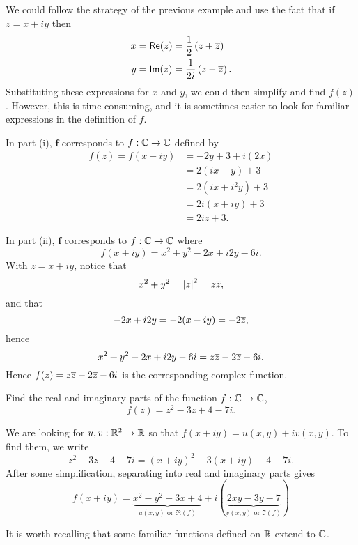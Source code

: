 \begin{solution}
We could follow the strategy of the previous example and use the fact that if $z=x+iy$ then
\begin{align*}
x & = \textsf{Re}(z) = \frac{1}{2} \left( z+ \overline{z} \right) \\
y & = \textsf{Im} (z) = \frac{1}{2i} \left( z- \overline{z} \right).
\end{align*}
Substituting these expressions for $x$ and $y$, we could then simplify and find $f(z)$. However, this is time consuming, and it is sometimes easier to look for familiar expressions in the definition of $f$.

In part (i), $\mathbf{f}$ corresponds to $f: \mathbb{C} \to \mathbb{C}$ defined by
\begin{align*}
f(z) = f(x+iy) &= -2y+3+i(2x) \\
& = 2(ix-y) + 3 \\
& = 2(ix+i^2y)+3 \\
& = 2i(x+iy)+3 \\
& = 2iz+3.
\end{align*}

In part (ii), $\mathbf{f}$ corresponds to $f:\mathbb{C} \to \mathbb{C}$ where
\[
f(x+iy) = x^2+y^2-2x+i2y-6i.
\]
With $z=x+iy$, notice that
\[
x^2+y^2=\left| z \right|^2 = z \overline{z},
\]
and that
\[
-2x+i2y = -2 (x-iy) = -2 \overline{z},
\]
hence
\[
x^2+y^2-2x+i2y-6i = z \overline{z} - 2 \overline{z} -6i.
\]
Hence $f(z) = z \overline{z}-2\overline{z}-6i$ is the corresponding complex function.



\end{solution}

\begin{example}
Find the real and imaginary parts of the function $f:\mathbb{C} \to \mathbb{C}$, 
\[
f(z) = z^2-3z+4-7i.
\]
\end{example}

\begin{solution}
We are looking for $u,v:\mathbb{R}^2 \to \mathbb{R}$ so that $f(x+iy)=u(x,y)+iv(x,y)$.  To find them, we write
\[
z^2-3z+4-7i=(x+iy)^2-3(x+iy)+4-7i.
\]
After some simplification, separating into real and imaginary parts gives
\[
f(x+iy) = \underbrace{x^2-y^2-3x+4}_{u(x,y) \text{ or } \Re (f)}+i (\underbrace{2xy-3y-7}_{v(x,y) \text{ or } \Im (f)})
\]
\end{solution}


It is worth recalling that some familiar functions defined on $\mathbb{R}$ extend to $\mathbb{C}$.

